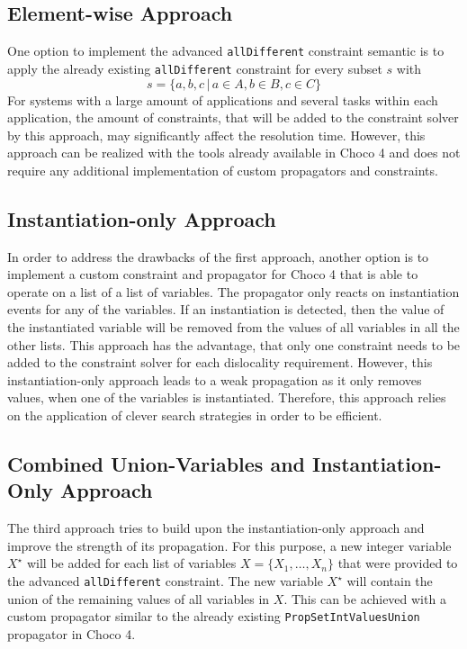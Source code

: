 \documentclass[english,biblatex]{lni}
\begin{document}
\subsection*{Element-wise Approach}

One option to implement the advanced \texttt{allDifferent} constraint semantic is to apply the already existing \texttt{allDifferent} constraint for every subset $s$ with
$$s = \{a,b,c \, \vert \, a \in A,  b \in B, c \in C\}$$
For systems with a large amount of applications and several tasks within each application, the amount of constraints, that will be added to the constraint solver by this approach, may significantly affect the resolution time.
However, this approach can be realized with the tools already available in Choco 4 and does not require any additional implementation of custom propagators and constraints.

\subsection*{Instantiation-only Approach}

In order to address the drawbacks of the first approach, another option is to implement a custom constraint and propagator for Choco 4 that is able to operate on a list of a list of variables.
The propagator only reacts on instantiation events for any of the variables.
If an instantiation is detected, then the value of the instantiated variable will be removed from the values of all variables in all the other lists.
This approach has the advantage, that only one constraint needs to be added to the constraint solver for each dislocality requirement.
However, this instantiation-only approach leads to a weak propagation as it only removes values, when one of the variables is instantiated.
Therefore, this approach relies on the application of clever search strategies in order to be efficient.

\subsection*{Combined Union-Variables and Instantiation-Only Approach}

The third approach tries to build upon the instantiation-only approach and improve the strength of its propagation.
For this purpose, a new integer variable $X^\star$ will be added for each list of variables $X = \{X_1, \dots, X_n\}$ that were provided to the advanced \texttt{allDifferent} constraint.
The new variable $X^\star$ will contain the union of the remaining values of all variables in $X$.
This can be achieved with a custom propagator similar to the already existing \texttt{PropSetIntValuesUnion} propagator in Choco 4.
\end{document}
